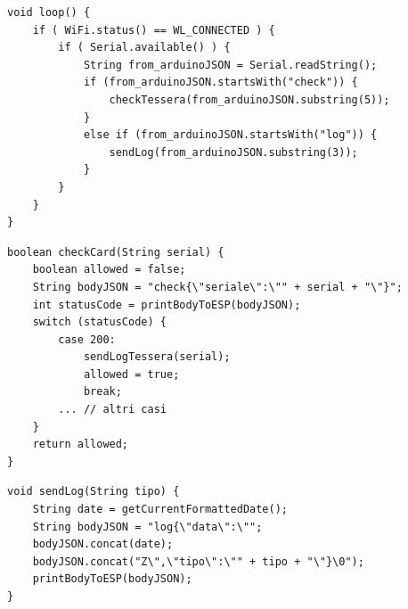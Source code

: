\documentclass[12pt]{report}
\begin{document}
\pagebreak 

\begin{lstlisting}[caption={L'ESP-01 si mette in ascolto sulla porta seriale collegata all'Arduino. Esso chiama la funzione corretta in base al formato della stringa ricevuta.}, label={lst:esp01_listen}]
void loop() {
	if ( WiFi.status() == WL_CONNECTED ) {
		if ( Serial.available() ) {
			String from_arduinoJSON = Serial.readString();
			if (from_arduinoJSON.startsWith("check")) {
				checkTessera(from_arduinoJSON.substring(5));
			}
			else if (from_arduinoJSON.startsWith("log")) {
				sendLog(from_arduinoJSON.substring(3));
			}
		}
	}
}
\end{lstlisting}
\begin{lstlisting}[caption={L'Arduino manda all'ESP-01 il seriale della tessera in formato JSON e aspetta la risposta con lo status code. Se statusCode = 200 allora mette la variabile allowed a \textquotedblleft{} true \textquotedblright{}. La funzione printBodyToESP si può vedere nel Listato \ref{lst:uno_printBodyToESP} }, label={lst:uno_checkCardSerial}]
boolean checkCard(String serial) {
	boolean allowed = false;
	String bodyJSON = "check{\"seriale\":\"" + serial + "\"}";
	int statusCode = printBodyToESP(bodyJSON);
	switch (statusCode) {
		case 200:
			sendLogTessera(serial);
			allowed = true;
			break;
		... // altri casi
	}
	return allowed;
}
\end{lstlisting}	
\begin{lstlisting}[caption={L'Arduino manda all'ESP-01 il log in formato JSON e aspetta la risposta con lo status code. La funzione printBodyToESP si può vedere nel Listato \ref{lst:uno_printBodyToESP}.}, label={lst:uno_sendLog}]
void sendLog(String tipo) {
	String date = getCurrentFormattedDate();
	String bodyJSON = "log{\"data\":\"";
	bodyJSON.concat(date);
	bodyJSON.concat("Z\",\"tipo\":\"" + tipo + "\"}\0");
	printBodyToESP(bodyJSON);
}
\end{lstlisting}
\end{document}
